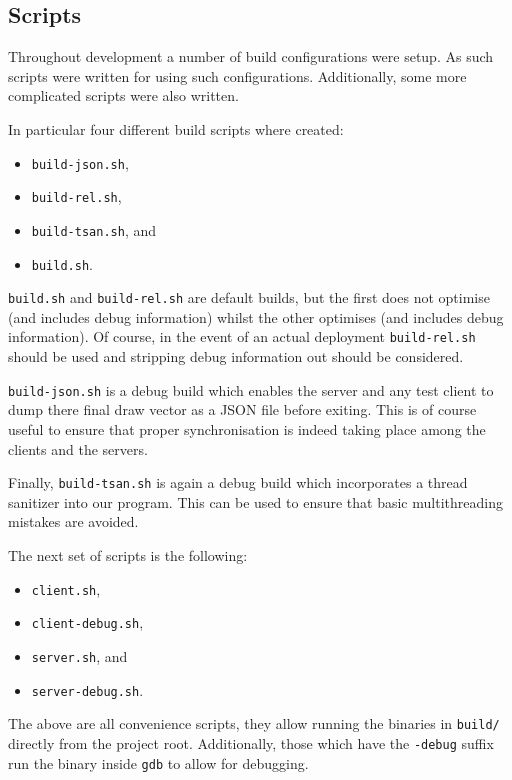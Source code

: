 \documentclass[article]{uom-coursework}
\begin{document}
\subsection{Scripts}

Throughout development a number of build configurations were
setup. As such scripts were written for using such
configurations. Additionally, some more complicated scripts were
also written.

In particular four different build scripts where created:

\begin{itemize}
    \item \texttt{build-json.sh},
    \item \texttt{build-rel.sh},
    \item \texttt{build-tsan.sh}, and
    \item \texttt{build.sh}.
\end{itemize}

\texttt{build.sh} and \texttt{build-rel.sh} are default builds,
but the first does not optimise (and includes debug information)
whilst the other optimises (and includes debug information). Of
course, in the event of an actual deployment
\texttt{build-rel.sh} should be used and stripping debug
information out should be considered.

\texttt{build-json.sh} is a debug build which enables the server
and any test client to dump there final draw vector as a JSON
file before exiting. This is of course useful to ensure that
proper synchronisation is indeed taking place among the clients
and the servers.

Finally, \texttt{build-tsan.sh} is again a debug build which
incorporates a thread sanitizer into our program. This can be
used to ensure that basic multithreading mistakes are avoided.

The next set of scripts is the following:

\begin{itemize}
    \item \texttt{client.sh},
    \item \texttt{client-debug.sh},
    \item \texttt{server.sh}, and
    \item \texttt{server-debug.sh}.
\end{itemize}

The above are all convenience scripts, they allow running the
binaries in \texttt{build/} directly from the project root.
Additionally, those which have the \texttt{-debug} suffix run
the binary inside \texttt{gdb} to allow for debugging.
\end{document}

